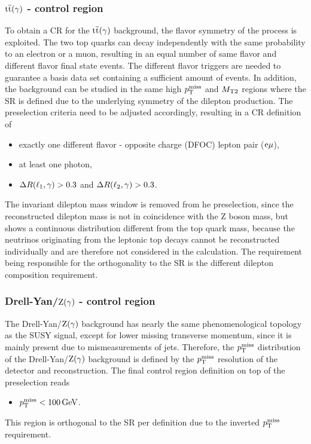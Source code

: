 \subsubsection*{${\mathrm{t}\overline{\mathrm{t}}}(\gamma)$ - control region}
To obtain a CR for the ${\mathrm{t}\overline{\mathrm{t}}}(\gamma)$ background, the flavor symmetry of the process is exploited. The two top quarks can decay independently with the same probability to an electron or a muon, resulting in an equal number of same flavor and different flavor final state events. The different flavor triggers are needed to guarantee a basis data set containing a sufficient amount of events. In addition, the background can be studied in the same high $p_{\mathrm{T}}^\text{miss}$ and $M_{\mathrm{T2}}$ regions where the SR is defined due to the underlying symmetry of the dilepton production. The preselection criteria need to be adjusted accordingly, resulting in a CR definition of
\begin{itemize}
 \item exactly one different flavor - opposite charge (DFOC) lepton pair ($\mathrm{e}{\mu}$),
 \item at least one photon,
 \item $\Delta R(\ell_1,\gamma)>0.3$ and $\Delta R(\ell_2,\gamma)>0.3$.
\end{itemize}
The invariant dilepton mass window is removed from he preselection, since the reconstructed dilepton mass is not in coincidence with the Z boson mass, but shows a continuous distribution different from the top quark mass, because the neutrinos originating from the leptonic top decays cannot be reconstructed individually and are therefore not considered in the calculation. The requirement being responsible for the orthogonality to the SR is the different dilepton composition requirement.
\subsubsection*{Drell-Yan/$\mathrm{Z}(\gamma)$ - control region}
The Drell-Yan/$\mathrm{Z}(\gamma)$ background has nearly the same phenomenological topology as the SUSY signal, except for lower missing transverse momentum, since it is mainly present due to mismeasurements of jets. Therefore, the $p_{\mathrm{T}}^\text{miss}$ distribution of the Drell-Yan/$\mathrm{Z}(\gamma)$ background is defined by the $p_{\mathrm{T}}^\text{miss}$ resolution of the detector and reconstruction. The final control region definition on top of the preselection reads
\begin{itemize}
 \item $p_{\mathrm{T}}^\text{miss}<100\,\text{Ge\hspace{-.08em}V}$.
\end{itemize}
This region is orthogonal to the SR per definition due to the inverted $p_{\mathrm{T}}^\text{miss}$ requirement.
